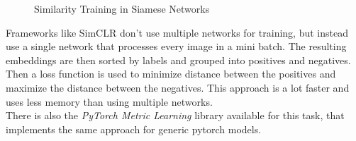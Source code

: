 \documentclass[12pt,a4paper]{report}
\begin{document}
\begin{figure}[h]
    \centering
    \qquad
    \caption{Similarity Training in Siamese Networks \cite{simclrartikle}}
\end{figure}

Frameworks like SimCLR\cite{simclr} don't use multiple networks for training, but instead use a single network that processes every image in a mini batch.
The resulting embeddings are then sorted by labels and grouped into positives and negatives.
Then a loss function is used to minimize distance between the positives and maximize the distance between the negatives.
This approach is a lot faster and uses less memory than using multiple networks.
\\
There is also the \textit{PyTorch Metric Learning}\cite{musgrave2020pytorch} library available for this task, that implements the same approach for generic pytorch models.

\newpage
\end{document}
